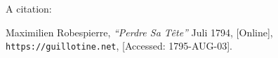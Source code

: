 \documentclass{article}
\begin{document}
A citation: \cite{robes}
\begin{thebibliography}{1}
        Maximilien Robespierre,
        \emph{``Perdre Sa T\^ete''}
        Juli 1794,
        [Online],
        \texttt{https://guillotine.net},
        [Accessed: 1795-AUG-03].
\end{thebibliography}
\end{document}
